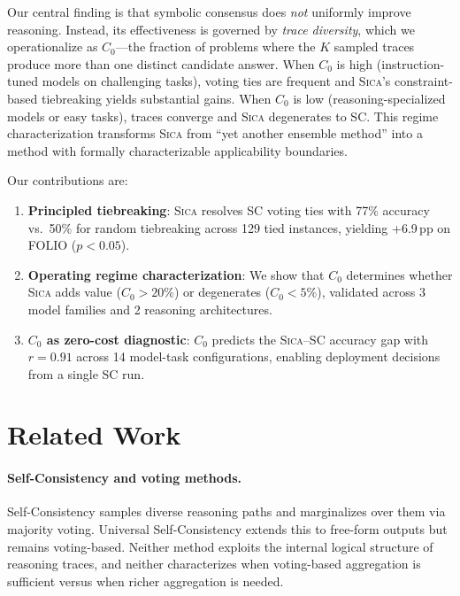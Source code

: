 \documentclass[11pt,a4paper]{article}
\newcommand{\sica}{\textsc{Sica}}
\newcommand{\czero}{C_0}
\begin{document}
Our central finding is that symbolic consensus does \emph{not} uniformly improve reasoning.
Instead, its effectiveness is governed by \emph{trace diversity}, which we operationalize as $\czero{}$---the fraction of problems where the $K$ sampled traces produce more than one distinct candidate answer.
When $\czero{}$ is high (instruction-tuned models on challenging tasks), voting ties are frequent and \sica{}'s constraint-based tiebreaking yields substantial gains.
When $\czero{}$ is low (reasoning-specialized models or easy tasks), traces converge and \sica{} degenerates to SC.
This regime characterization transforms \sica{} from ``yet another ensemble method'' into a method with formally characterizable applicability boundaries.

Our contributions are:
\begin{enumerate}[nosep,leftmargin=*]
  \item \textbf{Principled tiebreaking}: \sica{} resolves SC voting ties with 77\% accuracy vs.\ 50\% for random tiebreaking across 129 tied instances, yielding +6.9\,pp on FOLIO ($p{<}0.05$).
  \item \textbf{Operating regime characterization}: We show that $\czero{}$ determines whether \sica{} adds value ($\czero{}>20\%$) or degenerates ($\czero{}<5\%$), validated across 3 model families and 2 reasoning architectures.
  \item \textbf{$\czero{}$ as zero-cost diagnostic}: $\czero{}$ predicts the \sica{}--SC accuracy gap with $r{=}0.91$ across 14 model-task configurations, enabling deployment decisions from a single SC run.
\end{enumerate}


\section{Related Work}
\label{sec:related}

\paragraph{Self-Consistency and voting methods.}
Self-Consistency \cite{wang2023selfconsistency} samples diverse reasoning paths and marginalizes over them via majority voting.
Universal Self-Consistency \cite{chen2023universal} extends this to free-form outputs but remains voting-based.
Neither method exploits the internal logical structure of reasoning traces, and neither characterizes when voting-based aggregation is sufficient versus when richer aggregation is needed.
\end{document}

